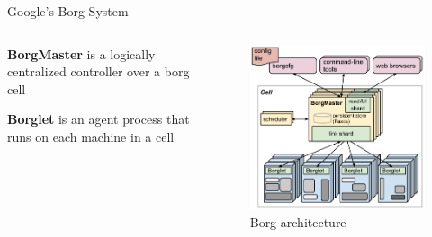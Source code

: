 \documentclass[10pt,xcolor={dvipsnames}, aspectratio=169]{beamer}
\begin{document}
\begin{frame}
{Google's Borg System} 
		\begin{columns}[T] %
			\begin{column}{.48\textwidth}
			\begin{block}
			{\textbf{BorgMaster} is a logically centralized controller over a borg cell}
			\end{block}
			\begin{block}
			{\textbf{Borglet} is an agent process that runs on each machine in a cell}
			\end{block}
		\end{column}%
		\hfill%
		\begin{column}{.48\textwidth}
			\begin{figure}
				\centering
				\includegraphics[scale=0.5]{images/borg_architecture.png}
				\caption{Borg architecture}
			\end{figure}
		\end{column}%
	\end{columns}
\end{frame}
\end{document}
